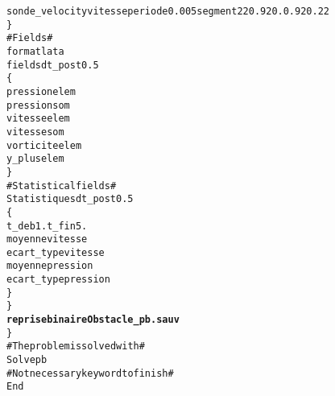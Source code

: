\begin{alltt}
            sonde_velocity  vitesse      periode 0.005   segment 22 0.92 0. 0.92 0.22 
        \} 
        # Fields # 
        format lata 
        fields dt_post 0.5 
        \{ 
            pression elem 
            pression som 
            vitesse elem 
            vitesse som 
            vorticite elem
            y_plus elem 
        \} 
        # Statistical fields # 
        Statistiques dt_post 0.5 
        \{ 
            t_deb 1. t_fin 5. 
            moyenne vitesse 
            ecart_type vitesse 
            moyenne pression 
            ecart_type pression 
        \} 
    \}
    {\bf{reprise binaire Obstacle_pb.sauv}}
\} 
# The problem is solved with # 
Solve pb 
# Not necessary keyword to finish # 
End 
\end{alltt}
